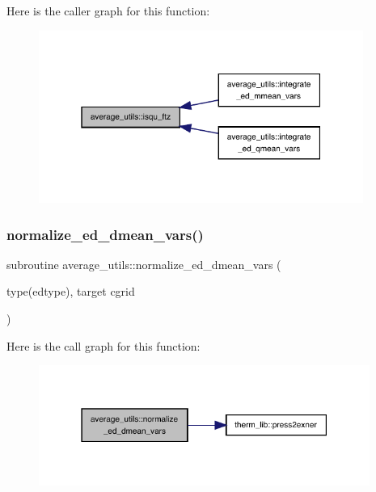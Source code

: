 Here is the caller graph for this function\+:
\nopagebreak
\begin{figure}[H]
\begin{center}
\leavevmode
\includegraphics[width=301pt]{namespaceaverage__utils_ac90817fe39c27153ed7bbee2cb856611_icgraph}
\end{center}
\end{figure}
\mbox{\label{namespaceaverage__utils_a2203ebc403bfd01a55cf7aac61777819}} 
\subsubsection{\texorpdfstring{normalize\+\_\+ed\+\_\+dmean\+\_\+vars()}{normalize\_ed\_dmean\_vars()}}
{\footnotesize\ttfamily subroutine average\+\_\+utils\+::normalize\+\_\+ed\+\_\+dmean\+\_\+vars (\begin{DoxyParamCaption}\item[{type(edtype), target}]{cgrid }\end{DoxyParamCaption})}

Here is the call graph for this function\+:
\nopagebreak
\begin{figure}[H]
\begin{center}
\leavevmode
\includegraphics[width=307pt]{namespaceaverage__utils_a2203ebc403bfd01a55cf7aac61777819_cgraph}
\end{center}
\end{figure}
\mbox{\label{namespaceaverage__utils_a662a31926be61beb22be003b5ec40343}} 
